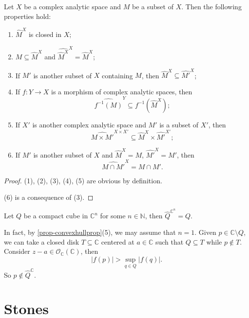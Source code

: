 \begin{proposition}\label{prop-convexhullprop}
    Let $X$ be a complex analytic space and $M$ be a subset of $X$. Then the following properties hold:
    \begin{enumerate}
        \item $\hat{M}^X$ is closed in $X$;
        \item $M\subseteq \hat{M}^X$ and $\widehat{\hat{M}^X}^X=\hat{M}^X$;
        \item If $M'$ is another subset of $X$ containing $M$, then $\hat{M}^X\subseteq \hat{M'}^X$;
        \item If $f:Y\rightarrow X$ is a morphism of complex analytic spaces, then
             \[ 
                \widehat{f^{-1}(M)}^Y\subseteq f^{-1}(\hat{M}^X);
             \]
        \item If $X'$ is another complex analytic space and $M'$ is a subset of $X'$, then
            \[
                \widehat{M\times M'}^{X\times X'}\subseteq \hat{M}^X\times \hat{M'}^{X'};  
            \]
        \item If $M'$ is another subset of $X$ and $\hat{M}^X=M$, $\hat{M'}^X=M'$, then
            \[
                \widehat{M\cap M'}^X=M\cap M'.    
            \]
    \end{enumerate}
\end{proposition}
\begin{proof}
    (1), (2), (3), (4), (5) are obvious by definition.

    (6) is a consequence of (3).
\end{proof}

\begin{example}\label{ex-tubeholhull}
    Let $Q$ be a compact cube in $\mathbb{C}^n$ for some $n\in \mathbb{N}$, then $\hat{Q}^{\mathbb{C}^n}=Q$.

    In fact, by \cref{prop-convexhullprop}(5), we may assume that $n=1$. Given $p\in \mathbb{C}\setminus Q$, we can take a closed disk $T\subseteq \mathbb{C}$ centered at $a\in \mathbb{C}$ such that $Q\subseteq T$ while $p\not\in T$. Consider $z-a\in \mathcal{O}_{\mathbb{C}}(\mathbb{C})$, then
    \[
        |f(p)|>\sup_{q\in Q}|f(q)|.  
    \]
    So $p\not\in \hat{Q}^{\mathbb{C}}$.
\end{example}

\section{Stones}


